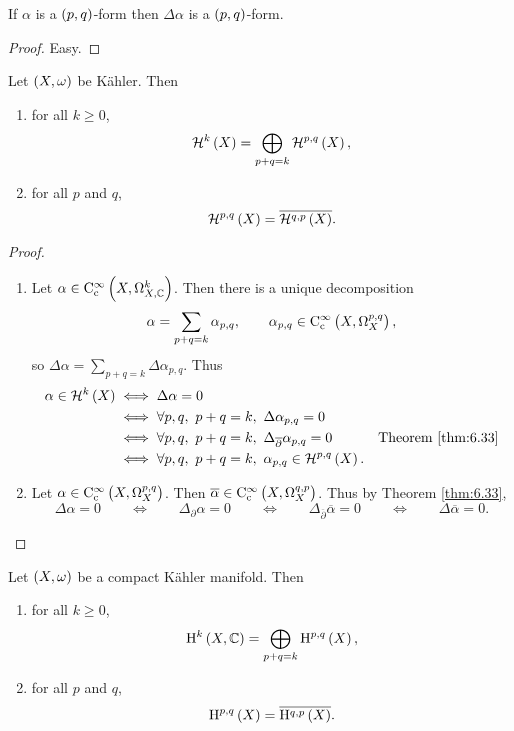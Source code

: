 \begin{lemma}
If $ \alpha $ is a $ \br{p, q} $-form then $ \Delta\alpha $ is a $ \br{p, q} $-form.
\end{lemma}

\begin{proof}
Easy.
\end{proof}

\begin{theorem}
\label{thm:6.35}
Let $ \br{X, \omega} $ be K\"ahler. Then
\begin{enumerate}
\item for all $ k \ge 0 $,
$$ \HHH^k\br{X} = \bigoplus_{p + q = k} \HHH^{p, q}\br{X}, $$
\item for all $ p $ and $ q $,
$$ \HHH^{p, q}\br{X} = \overline{\HHH^{q, p}\br{X}}. $$
\end{enumerate}
\end{theorem}

\begin{proof}
\hfill
\begin{enumerate}
\item Let $ \alpha \in \C_\c^\infty\br{X, \Omega_{X, \CC}^k} $. Then there is a unique decomposition
$$ \alpha = \sum_{p + q = k} \alpha_{p, q}, \qquad \alpha_{p, q} \in \C_\c^\infty\br{X, \Omega_X^{p, q}}, $$
so $ \Delta\alpha = \sum_{p + q = k} \Delta\alpha_{p, q} $. Thus
\begin{align*}
\alpha \in \HHH^k\br{X}
& \iff \Delta\alpha = 0 \\
& \iff \forall p, q, \ p + q = k, \ \Delta\alpha_{p, q} = 0 \\
& \iff \forall p, q, \ p + q = k, \ \Delta_{\overline{\partial}}\alpha_{p, q} = 0 & \text{Theorem \ref{thm:6.33}} \\
& \iff \forall p, q, \ p + q = k, \ \alpha_{p, q} \in \HHH^{p, q}\br{X}.
\end{align*}
\item Let $ \alpha \in \C_\c^\infty\br{X, \Omega_X^{p, q}} $. Then $ \overline{\alpha} \in \C_\c^\infty\br{X, \Omega_X^{q, p}} $. Thus by Theorem \ref{thm:6.33},
$$ \Delta\alpha = 0 \qquad \iff \qquad \Delta_\partial\alpha = 0 \qquad \iff \qquad \Delta_{\overline{\partial}}\overline{\alpha} = 0 \qquad \iff \qquad \Delta\overline{\alpha} = 0. $$
\end{enumerate}
\end{proof}

\pagebreak

\begin{theorem}
\label{thm:6.36}
Let $ \br{X, \omega} $ be a compact K\"ahler manifold. Then
\begin{enumerate}
\item for all $ k \ge 0 $,
$$ \H^k\br{X, \CC} = \bigoplus_{p + q = k} \H^{p, q}\br{X}, $$
\item for all $ p $ and $ q $,
$$ \H^{p, q}\br{X} = \overline{\H^{q, p}\br{X}}. $$
\end{enumerate}
\end{theorem}

